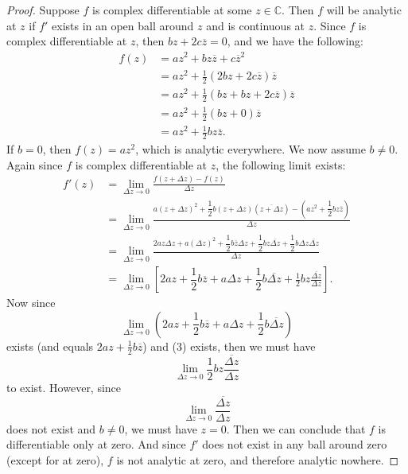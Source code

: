\documentclass[12pt]{article}
\newcommand{\conj}[1]{\overline{#1}}
\newcommand{\C}{\mathbb{C}}
\begin{document}
\begin{proof}
    Suppose $f$ is complex differentiable at some $z\in\C$. Then $f$ will be analytic at $z$ if $f'$ exists in an open ball around $z$ and is continuous at $z$. Since $f$ is complex differentiable at $z$, then $bz+2c\conj{z} = 0$, and we have the following:
    \begin{align*}
        f(z)
            &= az^2 + bz\conj{z} + c\conj{z}^2 \\
            &= az^2 + \frac12(2bz + 2c\conj{z})\conj{z} \\
            &= az^2 + \frac12(bz + bz + 2c\conj{z})\conj{z} \\
            &= az^2 + \frac12(bz + 0)\conj{z} \\
            &= az^2 + \frac12bz\conj{z}.
    \end{align*}
    If $b=0$, then $f(z) = az^2$, which is analytic everywhere. We now assume $b\ne0$. Again since $f$ is complex differentiable at $z$, the following limit exists:
    \begin{align}
        f'(z)
            &= \lim_{\Delta z \to 0}\frac{f(z+\Delta z) - f(z)}{\Delta z} \nonumber\\
            &= \lim_{\Delta z \to 0}\frac{a(z+\Delta z)^2 + \dfrac12b(z+\Delta z)\left(\conj{z+\Delta z}\right) - (az^2 + \dfrac12bz\conj{z})}{\Delta z} \nonumber\\ 
            &= \lim_{\Delta z \to 0}\frac{2az\Delta z + a(\Delta z)^2 + \dfrac12b\conj{z}\Delta z + \dfrac12bz\conj{\Delta z} + \dfrac12b\Delta z \conj{\Delta z}}{\Delta z} \nonumber\\ 
            &= \lim_{\Delta z \to 0}\left[2az + \dfrac12b\conj{z} + a\Delta z + \dfrac12b\conj{\Delta z} + \frac12bz\frac{\conj{\Delta z}}{\Delta z}\right]. 
    \end{align}
    Now since
    \[\lim_{\Delta z \to 0}\left(2az + \dfrac12b\conj{z} + a\Delta z + \dfrac12b\conj{\Delta z}\right)\]
    exists (and equals $2az + \frac12b\conj{z}$) and (3) exists, then we must have
    \[\lim_{\Delta z \to 0}\frac12bz\frac{\conj{\Delta z}}{\Delta z}\]
    to exist. However, since
    \[\lim_{\Delta z \to 0}\frac{\conj{\Delta z}}{\Delta z}\]
    does not exist and $b\ne0$, we must have $z=0$. Then we can conclude that $f$ is differentiable only at zero. And since $f'$ does not exist in any ball around zero (except for at zero), $f$ is not analytic at zero, and therefore analytic nowhere.
    
\end{proof}
\end{document}
